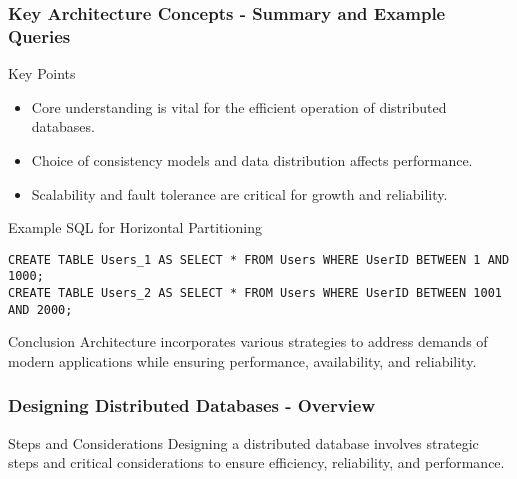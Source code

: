 \documentclass[aspectratio=169]{beamer}
\begin{document}
\begin{frame}[fragile]
  \frametitle{Key Architecture Concepts - Summary and Example Queries}
  \begin{block}{Key Points}
    \begin{itemize}
      \item Core understanding is vital for the efficient operation of distributed databases.
      \item Choice of consistency models and data distribution affects performance.
      \item Scalability and fault tolerance are critical for growth and reliability.
    \end{itemize}
  \end{block}
  
  \begin{block}{Example SQL for Horizontal Partitioning}
    \begin{lstlisting}
CREATE TABLE Users_1 AS SELECT * FROM Users WHERE UserID BETWEEN 1 AND 1000;
CREATE TABLE Users_2 AS SELECT * FROM Users WHERE UserID BETWEEN 1001 AND 2000;
    \end{lstlisting}
  \end{block}

  \begin{block}{Conclusion}
    Architecture incorporates various strategies to address demands of modern applications while ensuring performance, availability, and reliability.
  \end{block}
\end{frame}

\begin{frame}[fragile]
  \frametitle{Designing Distributed Databases - Overview}
  \begin{block}{Steps and Considerations}
    Designing a distributed database involves strategic steps and critical considerations to ensure efficiency, reliability, and performance.
  \end{block}
\end{frame}
\end{document}

